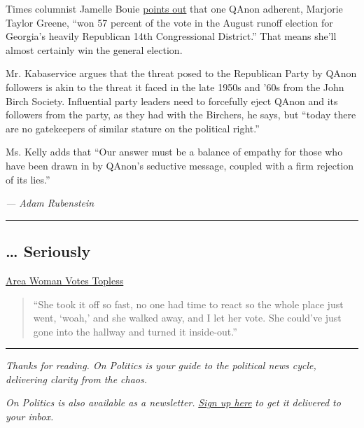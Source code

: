 Times columnist Jamelle Bouie
\href{https://www.nytimes3xbfgragh.onion/2020/09/04/opinion/the-conspiracist-in-chief-will-save-us-all.html}{points
out} that one QAnon adherent, Marjorie Taylor Greene, ``won 57 percent
of the vote in the August runoff election for Georgia's heavily
Republican 14th Congressional District.'' That means she'll almost
certainly win the general election.

Mr. Kabaservice argues that the threat posed to the Republican Party by
QAnon followers is akin to the threat it faced in the late 1950s and
'60s from the John Birch Society. Influential party leaders need to
forcefully eject QAnon and its followers from the party, as they had
with the Birchers, he says, but ``today there are no gatekeepers of
similar stature on the political right.''

Ms. Kelly adds that ``Our answer must be a balance of empathy for those
who have been drawn in by QAnon's seductive message, coupled with a firm
rejection of its lies.''

\emph{--- Adam Rubenstein}

\begin{center}\rule{0.5\linewidth}{\linethickness}\end{center}

\hypertarget{-seriously}{%
\subsection{\ldots{} Seriously}\label{-seriously}}

\href{https://www.seacoastonline.com/news/20200909/exeter-woman-votes-topless-after-anti-trump-shirt-disallowed}{Area
Woman Votes Topless}

\begin{quote}
``She took it off so fast, no one had time to react so the whole place
just went, `woah,' and she walked away, and I let her vote. She could've
just gone into the hallway and turned it inside-out.''
\end{quote}

\begin{center}\rule{0.5\linewidth}{\linethickness}\end{center}

\emph{Thanks for reading. On Politics is your guide to the political
news cycle, delivering clarity from the chaos.}

\emph{On Politics is also available as a newsletter.}
\href{https://www.nytimes3xbfgragh.onion/newsletters/politics}{\emph{Sign
up here}} \emph{to get it delivered to your inbox.}

